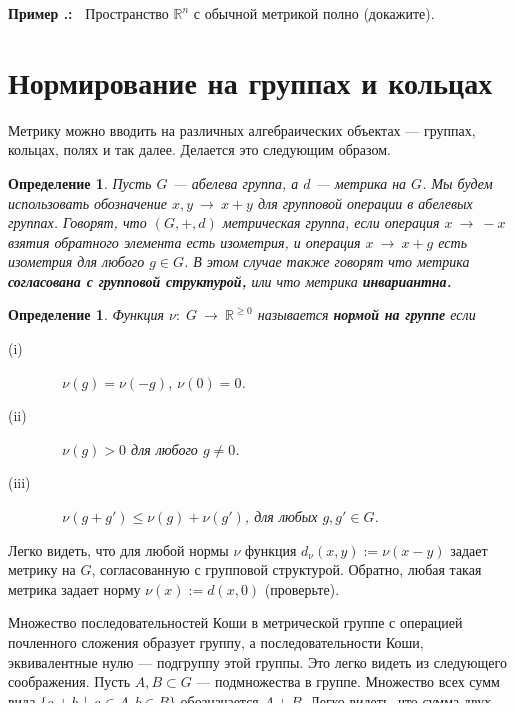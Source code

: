 \documentclass[12pt]{book}
\newcommand{\arrow}{{\:\longrightarrow\:}}
\renewcommand{\epsilon}{\varepsilon}
\def\R{{\mathbb R}}
\theoremstyle{upshape}
\theoremstyle{generic}
\newtheorem{opredelenie}[teorema]{Определение}
\def\еза{\end{remark}}
\theoremstyle{upshapenonumber}
\newcommand{\следствие}{%
     \refstepcounter{teorema}
     {\noindent\bf Следствие \thechapter.\arabic{teorema}:\ }}
\newcommand{\пример}{%
     \refstepcounter{teorema}
     {\noindent\bf Пример \thechapter.\arabic{teorema}:\ }}
\newcommand{\лемма}{%
     \refstepcounter{teorema}
     {\noindent\bf Лемма \thechapter.\arabic{teorema}:\ }}
\newcommand{\теорема}{%
     \refstepcounter{teorema}
     {\noindent\bf Теорема \thechapter.\arabic{teorema}:\ }}
\newcommand{\утверждение}{%
     \refstepcounter{teorema}
     {\noindent\bf Утверждение \thechapter.\arabic{teorema}:\ }}
\def\хфилл{\hfill}
\def\бф{\bf}
\def\ем{\em}
\def\ез{\end{zadacha}}
\def\еу{\end{ukazanie}}
\def\определение{\begin{opredelenie}}
\def\ео{\end{opredelenie}}
\def\енум{\begin{enumerate}}
\def\ее{\end{enumerate}}
\begin{document}
\хфилл

\пример
Пространство $\R^n$ с обычной метрикой полно (докажите).



\section{Нормирование на группах и кольцах}


Метрику можно вводить на различных алгебраических
объектах --- группах, кольцах, полях и так далее.
Делается это следующим образом.

\определение
Пусть $G$ --- абелева группа, а $d$ --- метрика на $G$.
Мы будем использовать обозначение $x, y \arrow x+y$
для групповой операции в абелевых группах.
Говорят, что $(G, +, d)$ метрическая группа,
если операция $x\arrow -x$ взятия обратного элемента
есть изометрия, и операция $x \arrow x +g$ есть
изометрия для любого $g\in G$. В этом случае
также говорят что метрика {\бф согласована с групповой
структурой,} или что метрика {\бф инвариантна.}
\ео

\определение
Функция $\nu:\; G \arrow \R^{\geq 0}$
называется {\бф нормой на группе} 
если 
\begin{description}
\item[(i)]\ \ $\nu(g) = \nu(-g)$, $\nu(0)=0$.
\item[(ii)] \ \ $\nu(g)>0$ для любого $g\neq 0$.
\item[(iii)] \ \ $\nu (g+g') \leq \nu(g) + \nu(g')$, для
любых $g, g'\in G$.
\end{description}
\ео

Легко видеть, что для любой нормы $\nu$ функция
$d_\nu(x,y):= \nu(x-y)$ задает метрику на $G$,
согласованную с групповой структурой. Обратно,
любая такая метрика задает норму $\nu(x):= d(x,0)$
(проверьте).

Множество последовательностей Коши в
метрической группе с операцией почленного сложения
образует группу, а  последовательности Коши, эквивалентные 
нулю --- подгруппу этой группы. Это легко видеть из
следующего соображения. Пусть $A, B\subset G$ --- подмножества в группе.
Множество всех сумм вида $\{ a+b\ \ |  \ \ a\in A, b\in B\}$
обозначается $A+B$. Легко видеть, что сумма двух шаров
радиуса $\epsilon, \epsilon'$ содержится в шаре
радиуса $\epsilon+\epsilon'$. Следовательно,
для любых последовательнпстей Коши $\{a_i\}$
$\{b_i\}$, все члены суммы $\{a_i+b_i\}$,
кроме конечного числа, содержатся в шаре
сколь угодно малого наперед заданного радиуса.
\end{document}
